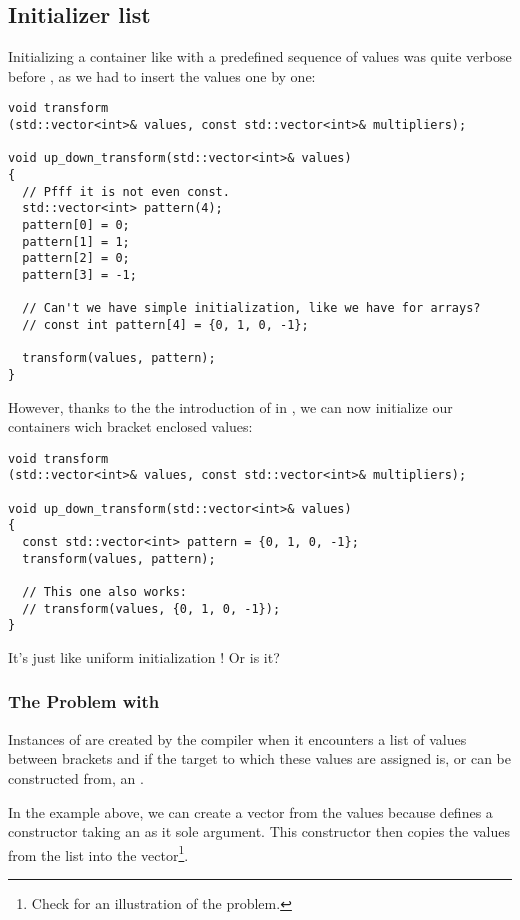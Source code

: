 \subsection{Initializer list}
\label{initializer-list}

Initializing a container like  with a predefined
sequence of values was quite verbose before , as we had to
insert the values one by one:

\begin{lstlisting}
void transform
(std::vector<int>& values, const std::vector<int>& multipliers);

void up_down_transform(std::vector<int>& values)
{
  // Pfff it is not even const.
  std::vector<int> pattern(4);
  pattern[0] = 0;
  pattern[1] = 1;
  pattern[2] = 0;
  pattern[3] = -1;

  // Can't we have simple initialization, like we have for arrays?
  // const int pattern[4] = {0, 1, 0, -1};

  transform(values, pattern);
}
\end{lstlisting}

%
%
However, thanks to the the introduction of
 in , we can now initialize our
containers wich bracket enclosed values:

\begin{lstlisting}
void transform
(std::vector<int>& values, const std::vector<int>& multipliers);

void up_down_transform(std::vector<int>& values)
{
  const std::vector<int> pattern = {0, 1, 0, -1};
  transform(values, pattern);

  // This one also works:
  // transform(values, {0, 1, 0, -1});
}
\end{lstlisting}

It's just like uniform initialization !
Or is it?

\subsubsection{The Problem with }

Instances of  are created by the compiler
when it encounters a list of values between brackets and if the target
to which these values are assigned is, or can be constructed from, an
.

In the example above, we can create a vector from the values because
 defines a constructor taking an
 as it sole argument. This constructor
then copies the values from the list into the vector\footnote{Check
  \cite{beware-of-copies-initializer-list} for an illustration of the
  problem.}.

